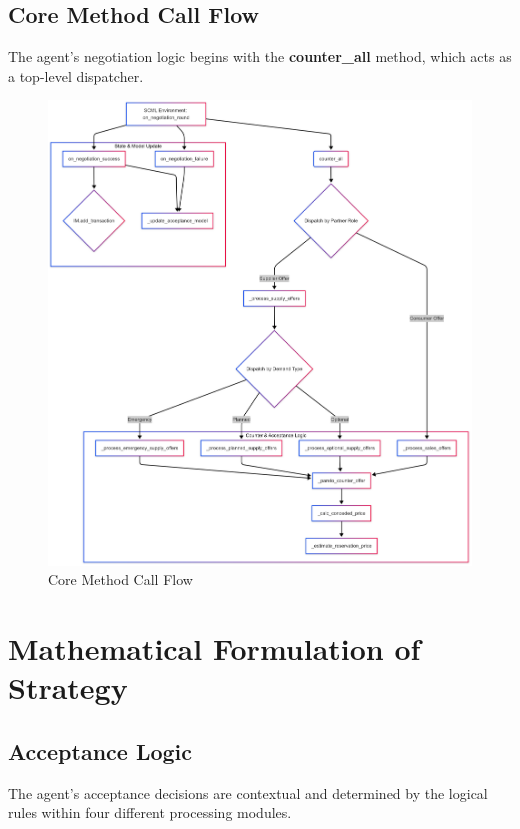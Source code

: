 \documentclass[12pt, a4paper]{article}
\begin{document}
\subsection{Core Method Call Flow}
The agent's negotiation logic begins with the \textbf{counter\_all} method, which acts as a top-level dispatcher.

\begin{figure}
    \centering
    \includegraphics[width=0.5\linewidth]{Editor _ Mermaid Chart-2025-06-08-092514.png}
    \caption{Core Method Call Flow}
    \label{fig:enter-label}
\end{figure}
\section{Mathematical Formulation of Strategy}

\subsection{Acceptance Logic}
The agent's acceptance decisions are contextual and determined by the logical rules within four different processing modules.
\end{document}
